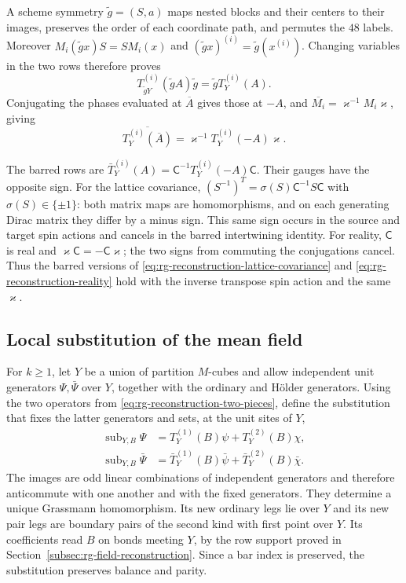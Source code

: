 A scheme symmetry $\tilde g=(S,a)$ maps nested blocks and their
centers to their images, preserves the order of each coordinate
path, and permutes the $48$ labels. Moreover
$M_i(\tilde gx)S=SM_i(x)$ and
$(\tilde gx)^{(i)}=\tilde g(x^{(i)})$.
Changing variables in the two rows therefore proves
\begin{equation}\label{eq:rg-reconstruction-lattice-covariance}
 T_{\tilde gY}^{(i)}(\tilde gA)\tilde g
                           =\tilde gT_Y^{(i)}(A).
\end{equation}
Conjugating the phases evaluated at $\overline A$ gives those at $-A$, and
$\overline{M_i}=\varkappa^{-1}M_i\varkappa$, giving
\begin{equation}\label{eq:rg-reconstruction-reality}
 \overline{T_Y^{(i)}(\overline A)}
                         =\varkappa^{-1}T_Y^{(i)}(-A)\varkappa.
\end{equation}

The barred rows are $\bar T_Y^{(i)}(A)=\mathsf C^{-1}T_Y^{(i)}(-A)\mathsf C$.
Their gauges have the opposite sign. For the lattice covariance,
$(S^{-1})^T=\sigma(S)\mathsf C^{-1}S\mathsf C$ with
$\sigma(S)\in\{\pm1\}$: both matrix maps are homomorphisms,
and on each generating Dirac matrix they differ by a minus
sign. This same sign occurs in the source and target spin
actions and cancels in the barred intertwining identity.
For reality, $\mathsf C$ is real and
$\varkappa\mathsf C=-\mathsf C\varkappa$; the two signs from
commuting the conjugations cancel. Thus the barred versions
of \eqref{eq:rg-reconstruction-lattice-covariance} and
\eqref{eq:rg-reconstruction-reality} hold with the inverse
transpose spin action and the same $\varkappa$.


\subsection{Local substitution of the mean field}
\label{subsec:rg-step-local-substitution}

For $k\ge1$, let $Y$ be a union of partition $M$-cubes and allow independent
unit generators $\Psi,\bar\Psi$ over $Y$, together
with the ordinary and H\"older generators.
Using the two operators from
\eqref{eq:rg-reconstruction-two-pieces}, define
the substitution that fixes the latter generators and
sets, at the unit sites of $Y$,
\begin{equation}\label{eq:rg-step-local-substitution}
 \begin{split}
 \operatorname{sub}_{Y,B}\Psi
       &=T_Y^{(1)}(B)\psi+T_Y^{(2)}(B)\chi,\\
 \operatorname{sub}_{Y,B}\bar\Psi
       &=\bar T_Y^{(1)}(B)\bar\psi+\bar T_Y^{(2)}(B)\bar\chi.
 \end{split}
\end{equation}
The images are odd linear combinations of independent
generators and therefore anticommute with one another
and with the fixed generators. They determine a
unique Grassmann homomorphism.
Its new ordinary legs lie over $Y$ and its new pair
legs are boundary pairs of the second kind with first
point over $Y$. Its coefficients read $B$ on bonds
meeting $Y$, by the row support proved in
Section~\ref{subsec:rg-field-reconstruction}.
Since a bar index is preserved, the substitution
preserves balance and parity.

